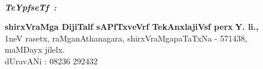 ~
\thispagestyle{empty}
\vfill


\noindent
{\sl\bfseries TeYpfseTf~:}
\medskip

\noindent
{\bf shirxVraMga DijiTalf sAPfTxveVrf TekAnxlajiVsf perx$\;$Y. li.,}\\[3pt]
{\rm 1}neV rasetx, raMganAthanagara, shirxVraMgapaTaTxNa - {\rm 571438},\\[3pt]
maMDayx jilelx.\\[4pt]
dUravANi : {\rm 08236 292432}
